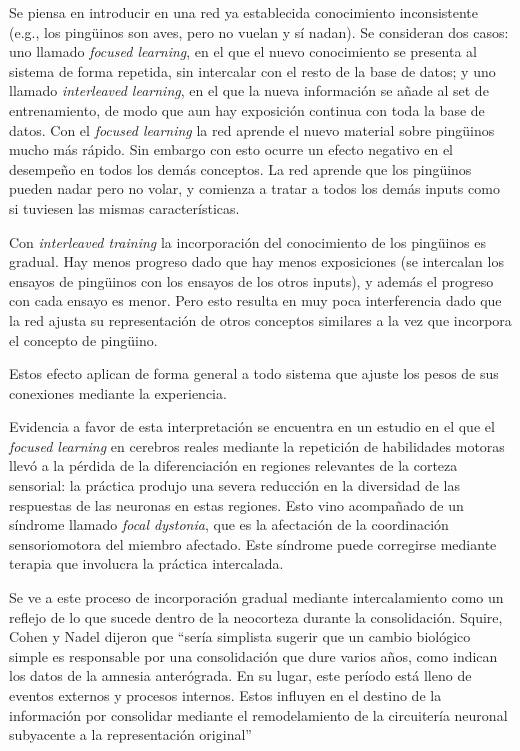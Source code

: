 \documentclass[a4paper,12pt]{article}
\begin{document}
Se piensa en introducir en una red ya establecida conocimiento inconsistente (e.g., los pingüinos son aves, pero no vuelan y sí nadan). Se consideran dos casos: uno llamado {\itshape focused learning}, en el que el nuevo conocimiento se presenta al sistema de forma repetida, sin intercalar con el resto de la base de datos; y uno llamado {\itshape interleaved learning}, en el que la nueva información se añade al set de entrenamiento, de modo que aun hay exposición continua con toda la base de datos. Con el {\itshape focused learning} la red aprende el nuevo material sobre pingüinos mucho más rápido. Sin embargo con esto ocurre un efecto negativo en el desempeño en todos los demás conceptos. La red aprende que los pingüinos pueden nadar pero no volar, y comienza a tratar a todos los demás inputs como si tuviesen las mismas características.

Con {\itshape interleaved training} la incorporación del conocimiento de los pingüinos es gradual. Hay menos progreso dado que hay menos exposiciones (se intercalan los ensayos de pingüinos con los ensayos de los otros inputs), y además el progreso con cada ensayo es menor. Pero esto resulta en muy poca interferencia dado que la red ajusta su representación de otros conceptos similares a la vez que incorpora el concepto de pingüino.

Estos efecto aplican de forma general a todo sistema que ajuste los pesos de sus conexiones mediante la experiencia. 

Evidencia a favor de esta interpretación se encuentra en un estudio en el que el {\itshape focused learning} en cerebros reales mediante la repetición de habilidades motoras llevó a la pérdida de la diferenciación en regiones relevantes de la corteza sensorial: la práctica produjo una severa reducción en la diversidad de las respuestas de las neuronas en estas regiones. Esto vino acompañado de un síndrome llamado {\itshape focal dystonia}, que es la afectación de la coordinación sensoriomotora del miembro afectado. Este síndrome puede corregirse mediante terapia que involucra la práctica intercalada.

Se ve a este proceso de incorporación gradual mediante intercalamiento como un reflejo de lo que sucede dentro de la neocorteza durante la consolidación. Squire, Cohen y Nadel dijeron que ``sería simplista sugerir que un cambio biológico simple es responsable por una consolidación que dure varios años, como indican los datos de la amnesia anterógrada. En su lugar, este período está lleno de eventos externos y procesos internos. Estos influyen en el destino de la información por consolidar mediante el remodelamiento de la circuitería neuronal subyacente a la representación original''
\end{document}
